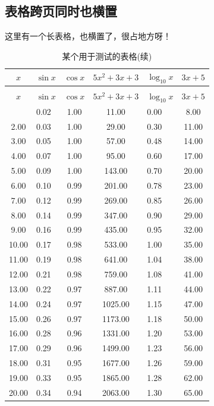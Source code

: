 \subsection{表格跨页同时也横置}
这里有一个长表格，也横置了，很占地方呀！
\begin{landscape}
		\begin{longtable}{cm{4cm}ccp{4cm}c}
		\caption{某个用于测试的表格} \label{tab4} \\
		\hline
		$x$ & $\sin x$ & $\cos x$ & $5x^{2}+3x+3$ & $\log_{10}x$ & $3x+5$\\
		\hline
		\endfirsthead
		\caption*{某个用于测试的表格(续)}\\
		\hline
		$x$ & $\sin x$ & $\cos x$ & $5x^{2}+3x+3$ & $\log_{10}x$ & $3x+5$\\
		\hline
		\endhead
		\hline
		\endfoot
		\hline
		\endlastfoot
		1.00 & 0.02 & 1.00 & 11.00 & 0.00 & 8.00\\
		2.00 & 0.03 & 1.00 & 29.00 & 0.30 & 11.00\\
		3.00 & 0.05 & 1.00 & 57.00 & 0.48 & 14.00\\
		4.00 & 0.07 & 1.00 & 95.00 & 0.60 & 17.00\\
		5.00 & 0.09 & 1.00 & 143.00 & 0.70 & 20.00\\
		6.00 & 0.10 & 0.99 & 201.00 & 0.78 & 23.00\\
		7.00 & 0.12 & 0.99 & 269.00 & 0.85 & 26.00\\
		8.00 & 0.14 & 0.99 & 347.00 & 0.90 & 29.00\\
		9.00 & 0.16 & 0.99 & 435.00 & 0.95 & 32.00\\
		10.00 & 0.17 & 0.98 & 533.00 & 1.00 & 35.00\\
		11.00 & 0.19 & 0.98 & 641.00 & 1.04 & 38.00\\
		12.00 & 0.21 & 0.98 & 759.00 & 1.08 & 41.00\\
		13.00 & 0.22 & 0.97 & 887.00 & 1.11 & 44.00\\
		14.00 & 0.24 & 0.97 & 1025.00 & 1.15 & 47.00\\
		15.00 & 0.26 & 0.97 & 1173.00 & 1.18 & 50.00\\
		16.00 & 0.28 & 0.96 & 1331.00 & 1.20 & 53.00\\
		17.00 & 0.29 & 0.96 & 1499.00 & 1.23 & 56.00\\
		18.00 & 0.31 & 0.95 & 1677.00 & 1.26 & 59.00\\
		19.00 & 0.33 & 0.95 & 1865.00 & 1.28 & 62.00\\
		20.00 & 0.34 & 0.94 & 2063.00 & 1.30 & 65.00\\

\end{longtable}
\end{landscape}
